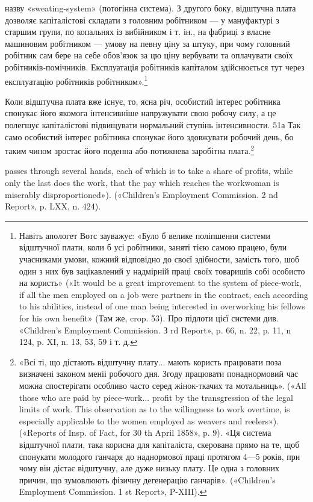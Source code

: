 назву «sweating-system» (потогінна система). З другого боку,
відштучна плата дозволяє капіталістові складати з головним робітником
— у мануфактурі з старшим групи, по копальнях із
вибійником і т. ін., на фабриці з власне машиновим робітником —
умову на певну ціну за штуку, при чому головний робітник сам
бере на себе обов’язок за цю ціну вербувати та оплачувати своїх
робітників-помічників. Експлуатація робітників капіталом здійснюється
тут через експлуатацію робітників робітником».\footnote{
Навіть апологет Вотс зауважує: «Було б велике поліпшення
системи відштучної плати, коли б усі робітники, заняті тією самою працею,
були учасниками умови, кожний відповідно до своєї здібности, замість
того, шоб один з них був зацікавлений у надмірній праці своїх
товаришів собі особисто на користь» («It would be a great improvement
to the system of piece-work, if all the men employed on a job were partners
in the contract, each according to his abilities, instead of one man
being interested in overworking his fellows for his own benefit» (Там же,
crop. 53). Про підлоти цієї системи див. «Children’s Employment Commission.
З rd Report», p. 66, n. 22, p. 11, n 124, p. XI, n. 13, 53, 59 і т. д.
}

Коли відштучна плата вже існує, то, ясна річ, особистий інтерес
робітника спонукає його якомога інтенсивніше напружувати
свою робочу силу, а це полегшує капіталістові підвищувати нормальний
ступінь інтенсивности. 51а Так само особистий інтерес
робітника спонукає його здовжувати робочий день, бо таким
чином зростає його поденна або потижнева заробітна плата.\footnote{
«Всі ті, що дістають відштучну плату... мають користь працювати
поза визначені законом меніі робочого дня. Згоду працювати понаднормовий
час можна спостерігати особливо часто серед жінок-ткачих та мотальниць».
(«All those who are paid by piece-work... profit by the transgression
of the legal limits of work. This observation as to the willingness
to work overtime, is especially applicable to the women employed as weavers
and reelers»). («Reports of Insp. of Fact, for 30 th April 1858», p. 9).
«Ця система відштучної плати, така корисна для капіталіста, скерована
прямо на те, щоб спонукати молодого ганчаря до наднормової праці
протягом 4—5 років, при чому він дістає відштучну, але дуже низьку плату.
Це одна з головних причин, що зумовлюють фізичну дегенерацію ганчарів».
(«Children’s Employment Commission. 1 st Report», P-XIII).
}

passes through several hands, each of which is to take a share of profits,
while only the last does the work, that the pay which reaches the workwoman
is miserably disproportioned»). («Children’s Employment Commission.
2 nd Report», p. LXX, n. 424).

